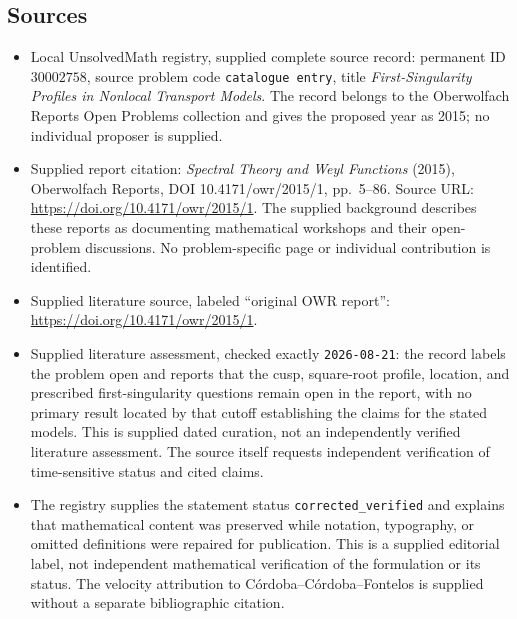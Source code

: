 \documentclass[11pt]{article}
\begin{document}
\subsection{Sources}
\begin{itemize}
\item Local UnsolvedMath registry, supplied complete source record: permanent ID \(30002758\), source problem code \texttt{catalogue entry}, title \emph{First-Singularity Profiles in Nonlocal Transport Models}. The record belongs to the Oberwolfach Reports Open Problems collection and gives the proposed year as 2015; no individual proposer is supplied.
\item Supplied report citation: \emph{Spectral Theory and Weyl Functions} (2015), Oberwolfach Reports, DOI 10.4171/owr/2015/1, pp.\ 5--86. Source URL: \url{https://doi.org/10.4171/owr/2015/1}. The supplied background describes these reports as documenting mathematical workshops and their open-problem discussions. No problem-specific page or individual contribution is identified.
\item Supplied literature source, labeled ``original OWR report'': \url{https://doi.org/10.4171/owr/2015/1}.
\item Supplied literature assessment, checked exactly \texttt{2026-08-21}: the record labels the problem open and reports that the cusp, square-root profile, location, and prescribed first-singularity questions remain open in the report, with no primary result located by that cutoff establishing the claims for the stated models. This is supplied dated curation, not an independently verified literature assessment. The source itself requests independent verification of time-sensitive status and cited claims.
\item The registry supplies the statement status \texttt{corrected\_verified} and explains that mathematical content was preserved while notation, typography, or omitted definitions were repaired for publication. This is a supplied editorial label, not independent mathematical verification of the formulation or its status. The velocity attribution to C\'ordoba--C\'ordoba--Fontelos is supplied without a separate bibliographic citation.
\end{itemize}
\end{document}
